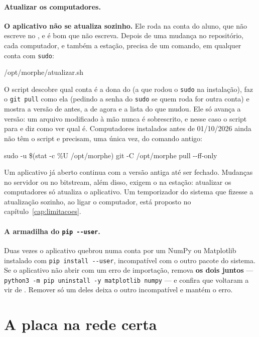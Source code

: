 \paragraph{Atualizar os computadores.}
\label{sec:atualizar}
\textbf{O aplicativo não se atualiza sozinho.} Ele roda na conta do aluno, que
não escreve no , e é bom que não escreva. Depois de uma
mudança no repositório, cada computador, e também a estação, precisa de um
comando, em qualquer conta com \texttt{sudo}:

\begin{center}
\ttfamily /opt/morphe/atualizar.sh
\end{center}

\noindent O script descobre qual conta é a dona do  (a que
rodou o \texttt{sudo} na instalação), faz o \texttt{git pull} como ela (pedindo
a senha do \texttt{sudo} se quem roda for outra conta) e mostra a versão de
antes, a de agora e a lista do que mudou. Ele só avança a versão: um arquivo
modificado à mão nunca é sobrescrito, e nesse caso o script para e diz como ver
qual é. Computadores instalados antes de 01/10/2026 ainda não têm o script e
precisam, uma única vez, do comando antigo:

\begin{center}
\ttfamily sudo -u \$(stat -c \%U /opt/morphe) git -C /opt/morphe pull -{}-ff-only
\end{center}

Um aplicativo já aberto continua com a versão antiga até ser fechado. Mudanças
no servidor ou no bitstream, além disso, exigem o  na
estação: atualizar os computadores só atualiza o aplicativo. Um temporizador do
sistema que fizesse a atualização sozinho, ao ligar o computador, está proposto
no capítulo~\ref{cap:limitacoes}.

\paragraph{A armadilha do \texttt{pip -{}-user}.} Duas vezes o aplicativo
quebrou numa conta por um NumPy ou Matplotlib instalado com
\texttt{pip install -{}-user}, incompatível com o outro pacote do sistema. Se o
aplicativo não abrir com um erro de importação, remova \textbf{os dois juntos}
--- \texttt{python3 -m pip uninstall -y matplotlib numpy} --- e confira que
voltaram a vir de . Remover só um deles
deixa o outro incompatível e mantém o erro.

\section{A placa na rede certa}
\label{sec:rede-placa}

